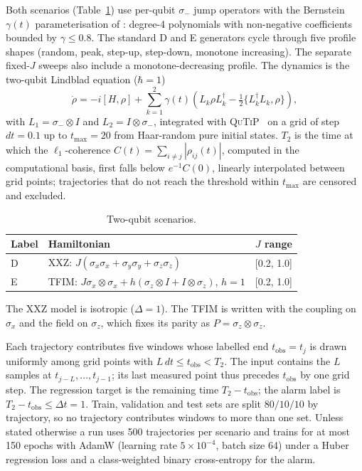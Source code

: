 \documentclass[twocolumn,10pt]{article}
\begin{document}
Both scenarios (Table~\ref{tab:scenarios2}) use per-qubit $\sigma_-$
jump operators with the Bernstein $\gamma(t)$ parameterisation of
\cite{Paper1Brusnikin}: degree-4 polynomials with non-negative
coefficients bounded by $\gamma \leq 0.8$. The standard D and E
generators cycle through five profile shapes (random, peak, step-up,
step-down, monotone increasing). The separate fixed-$J$ sweeps also
include a monotone-decreasing profile.
The dynamics is the two-qubit Lindblad equation ($\hbar = 1$)
\begin{equation}
  \dot\rho = -i[H,\rho]
  + \sum_{k=1}^{2} \gamma(t)\!\left(
      L_k \rho L_k^\dagger
      - \tfrac{1}{2}\{L_k^\dagger L_k, \rho\}\right),
  \label{eq:lindblad2}
\end{equation}
with $L_1 = \sigma_-\otimes I$ and $L_2 = I\otimes\sigma_-$, integrated
with \textsc{QuTiP}~\cite{qutip} \cite{Lindblad1976,Breuer2002} on a grid
of step $dt = 0.1$ up to $t_\mathrm{max} = 20$ from Haar-random pure
initial states.
$T_2$ is the time at which the $\ell_1$-coherence
$C(t)=\sum_{i\neq j}|\rho_{ij}(t)|$, computed in the computational
basis, first falls below $e^{-1}C(0)$, linearly interpolated between grid
points; trajectories that do not reach the threshold within
$t_\mathrm{max}$ are censored and excluded.

\begin{table}[h]
\centering
\caption{Two-qubit scenarios.\label{tab:scenarios2}}
\scriptsize
\setlength{\tabcolsep}{4pt}
\begin{tabular}{lll}
\toprule
Label & Hamiltonian & $J$ range \\
\midrule
D & XXZ: $J(\sigma_x\sigma_x + \sigma_y\sigma_y + \sigma_z\sigma_z)$ & [0.2, 1.0] \\
E & TFIM: $J\sigma_x\!\otimes\!\sigma_x + h(\sigma_z\!\otimes\! I + I\!\otimes\!\sigma_z)$, $h{=}1$ & [0.2, 1.0] \\
\bottomrule
\end{tabular}
\end{table}

The XXZ model is isotropic ($\Delta = 1$). The TFIM is written with the
coupling on $\sigma_x$ and the field on $\sigma_z$, which fixes its
parity as $P = \sigma_z\otimes\sigma_z$.

Each trajectory contributes five windows whose labelled end
$t_\mathrm{obs}=t_j$ is drawn uniformly among grid points with
$L\,dt \le t_\mathrm{obs} < T_2$. The input contains the $L$ samples at
$t_{j-L},\ldots,t_{j-1}$; its last measured point thus precedes
$t_\mathrm{obs}$ by one grid step.
The regression target is the remaining time $T_2 - t_\mathrm{obs}$; the
alarm label is $T_2 - t_\mathrm{obs} \le \Delta t = 1$.
Train, validation and test sets are split $80/10/10$ by trajectory, so
no trajectory contributes windows to more than one set.
Unless stated otherwise a run uses 500 trajectories per scenario and
trains for at most 150 epochs with AdamW (learning rate
$5\times10^{-4}$, batch size 64) under a Huber regression loss and a
class-weighted binary cross-entropy for the alarm.
\end{document}
